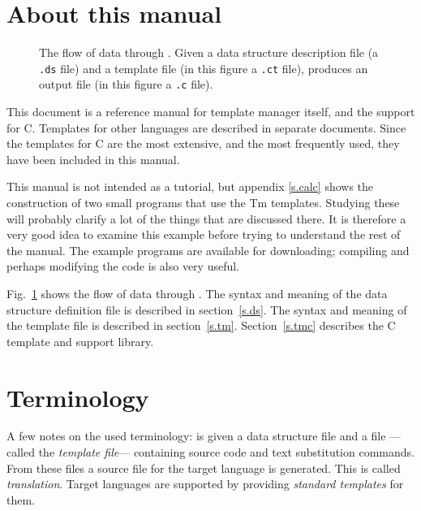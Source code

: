 \section{About this manual}
\begin{figure}
\begin{center}

\end{center}
\caption{\label{f.flow}The flow of data through {\Tm}.
Given a data structure description file (a {\tt .ds} file) and
a template file (in this figure a {\tt .ct} file), {\Tm} produces
an output file (in this figure a {\tt .c} file).
}
\end{figure}
This document is a reference manual for template manager itself, and the
support for C. Templates for other languages are described in
separate documents. Since the templates for C are the most
extensive, and the most frequently used, they have been included
in this manual.
\par
This manual is not intended as a tutorial, but appendix \ref{s.calc}
shows the construction of two small programs that use the Tm templates.
Studying these will probably clarify a lot of the things that are
discussed there. It is therefore a very good idea to examine this example
before trying to understand the rest of the manual. The example programs
are available for downloading; compiling and perhaps modifying the code
is also very useful.
\par
Fig.~\ref{f.flow} shows the flow of data through {\Tm}. The syntax and
meaning of the data structure
definition file is described in section~\ref{s.ds}.
The syntax and meaning of the template file is described in
section~\ref{s.tm}.
Section~\ref{s.tmc} describes the C template and support library.
\section{Terminology}
A few notes on the used terminology:
{\Tm} is given a data structure file and a file
---called the {\em template file}---
containing source code and text substitution commands.
From these files a source file for the target language is generated.
This is called {\em translation}.
Target languages are supported by providing {\em standard templates} \/for
them.
